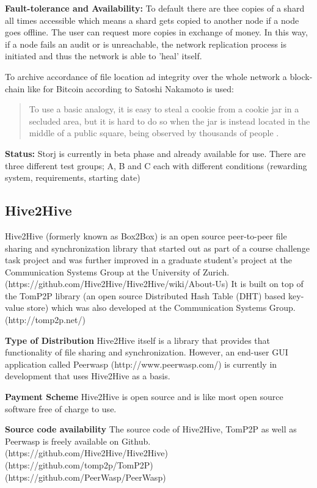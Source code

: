 \textbf{Fault-tolerance and Availability:} To default there are thee copies of a shard all times accessible which means a shard gets copied to another node if a node goes offline. The user can request more copies in exchange of money. In this way, if a node fails an audit or is unreachable, the network replication process is initiated and thus the network is able to 'heal' itself.

To archive accordance of file location ad integrity over the whole network a block-chain like for Bitcoin according to Satoshi Nakamoto \cite{bitcoin} is used:

\begin{quotation}To use a basic analogy, it is easy to steal a cookie from a cookie jar in a secluded area, but it is hard to do so when the jar is instead located in the middle of a public square, being observed by thousands of people \cite{storj:PDF}.\end{quotation}

\textbf{Status:} Storj is currently in beta phase and already available for use. There are three different test groups; A, B and C each with different conditions (rewarding system, requirements, starting date) \cite {storj:earlyaccess}

\subsection{Hive2Hive} %
Hive2Hive (formerly known as Box2Box) is an open source peer-to-peer file sharing and synchronization library that started out as part of a course challenge task project and was further improved in a graduate student's project at the Communication Systems Group at the University of Zurich. (https://github.com/Hive2Hive/Hive2Hive/wiki/About-Us) It is built on top of the TomP2P library (an open source Distributed Hash Table (DHT) based key-value store) which was also developed at the Communication Systems Group. (http://tomp2p.net/)

\textbf{Type of Distribution}
Hive2Hive itself is a library that provides that functionality of file sharing and synchronization. However, an end-user GUI application called Peerwasp (http://www.peerwasp.com/) is currently in development that uses Hive2Hive as a basis.

\textbf{Payment Scheme}
Hive2Hive is open source and is like most open source software free of charge to use.

\textbf{Source code availability}
The source code of Hive2Hive, TomP2P as well as Peerwasp is freely available on Github. (https://github.com/Hive2Hive/Hive2Hive) (https://github.com/tomp2p/TomP2P) (https://github.com/PeerWasp/PeerWasp)

